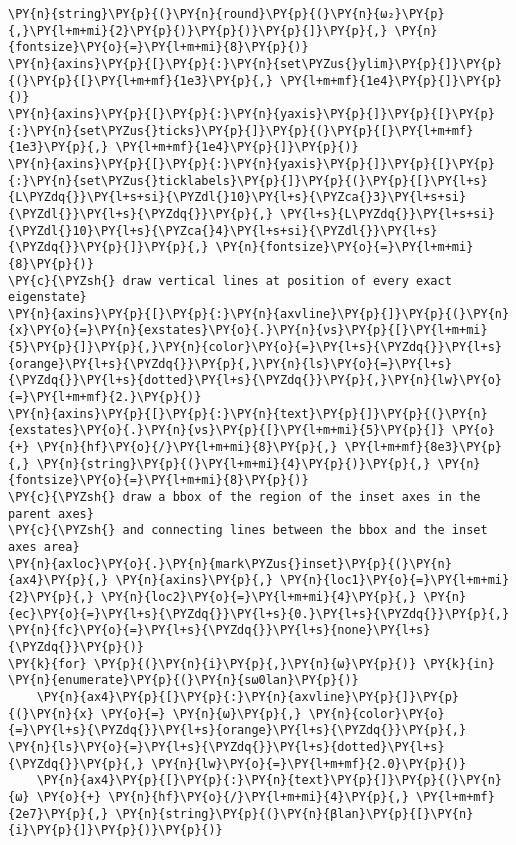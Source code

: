 \begin{Verbatim}[commandchars=\\\{\}]
   \PY{n}{string}\PY{p}{(}\PY{n}{round}\PY{p}{(}\PY{n}{ω₂}\PY{p}{,}\PY{l+m+mi}{2}\PY{p}{)}\PY{p}{)}\PY{p}{]}\PY{p}{,} \PY{n}{fontsize}\PY{o}{=}\PY{l+m+mi}{8}\PY{p}{)}
\PY{n}{axins}\PY{p}{[}\PY{p}{:}\PY{n}{set\PYZus{}ylim}\PY{p}{]}\PY{p}{(}\PY{p}{[}\PY{l+m+mf}{1e3}\PY{p}{,} \PY{l+m+mf}{1e4}\PY{p}{]}\PY{p}{)}
\PY{n}{axins}\PY{p}{[}\PY{p}{:}\PY{n}{yaxis}\PY{p}{]}\PY{p}{[}\PY{p}{:}\PY{n}{set\PYZus{}ticks}\PY{p}{]}\PY{p}{(}\PY{p}{[}\PY{l+m+mf}{1e3}\PY{p}{,} \PY{l+m+mf}{1e4}\PY{p}{]}\PY{p}{)}
\PY{n}{axins}\PY{p}{[}\PY{p}{:}\PY{n}{yaxis}\PY{p}{]}\PY{p}{[}\PY{p}{:}\PY{n}{set\PYZus{}ticklabels}\PY{p}{]}\PY{p}{(}\PY{p}{[}\PY{l+s}{L\PYZdq{}}\PY{l+s+si}{\PYZdl{}10}\PY{l+s}{\PYZca{}3}\PY{l+s+si}{\PYZdl{}}\PY{l+s}{\PYZdq{}}\PY{p}{,} \PY{l+s}{L\PYZdq{}}\PY{l+s+si}{\PYZdl{}10}\PY{l+s}{\PYZca{}4}\PY{l+s+si}{\PYZdl{}}\PY{l+s}{\PYZdq{}}\PY{p}{]}\PY{p}{,} \PY{n}{fontsize}\PY{o}{=}\PY{l+m+mi}{8}\PY{p}{)}
\PY{c}{\PYZsh{} draw vertical lines at position of every exact eigenstate}
\PY{n}{axins}\PY{p}{[}\PY{p}{:}\PY{n}{axvline}\PY{p}{]}\PY{p}{(}\PY{n}{x}\PY{o}{=}\PY{n}{exstates}\PY{o}{.}\PY{n}{νs}\PY{p}{[}\PY{l+m+mi}{5}\PY{p}{]}\PY{p}{,}\PY{n}{color}\PY{o}{=}\PY{l+s}{\PYZdq{}}\PY{l+s}{orange}\PY{l+s}{\PYZdq{}}\PY{p}{,}\PY{n}{ls}\PY{o}{=}\PY{l+s}{\PYZdq{}}\PY{l+s}{dotted}\PY{l+s}{\PYZdq{}}\PY{p}{,}\PY{n}{lw}\PY{o}{=}\PY{l+m+mf}{2.}\PY{p}{)}
\PY{n}{axins}\PY{p}{[}\PY{p}{:}\PY{n}{text}\PY{p}{]}\PY{p}{(}\PY{n}{exstates}\PY{o}{.}\PY{n}{νs}\PY{p}{[}\PY{l+m+mi}{5}\PY{p}{]} \PY{o}{+} \PY{n}{hf}\PY{o}{/}\PY{l+m+mi}{8}\PY{p}{,} \PY{l+m+mf}{8e3}\PY{p}{,} \PY{n}{string}\PY{p}{(}\PY{l+m+mi}{4}\PY{p}{)}\PY{p}{,} \PY{n}{fontsize}\PY{o}{=}\PY{l+m+mi}{8}\PY{p}{)}
\PY{c}{\PYZsh{} draw a bbox of the region of the inset axes in the parent axes}
\PY{c}{\PYZsh{} and connecting lines between the bbox and the inset axes area}
\PY{n}{axloc}\PY{o}{.}\PY{n}{mark\PYZus{}inset}\PY{p}{(}\PY{n}{ax4}\PY{p}{,} \PY{n}{axins}\PY{p}{,} \PY{n}{loc1}\PY{o}{=}\PY{l+m+mi}{2}\PY{p}{,} \PY{n}{loc2}\PY{o}{=}\PY{l+m+mi}{4}\PY{p}{,} \PY{n}{ec}\PY{o}{=}\PY{l+s}{\PYZdq{}}\PY{l+s}{0.}\PY{l+s}{\PYZdq{}}\PY{p}{,} \PY{n}{fc}\PY{o}{=}\PY{l+s}{\PYZdq{}}\PY{l+s}{none}\PY{l+s}{\PYZdq{}}\PY{p}{)}
\PY{k}{for} \PY{p}{(}\PY{n}{i}\PY{p}{,}\PY{n}{ω}\PY{p}{)} \PY{k}{in} \PY{n}{enumerate}\PY{p}{(}\PY{n}{sω0lan}\PY{p}{)}
    \PY{n}{ax4}\PY{p}{[}\PY{p}{:}\PY{n}{axvline}\PY{p}{]}\PY{p}{(}\PY{n}{x} \PY{o}{=} \PY{n}{ω}\PY{p}{,} \PY{n}{color}\PY{o}{=}\PY{l+s}{\PYZdq{}}\PY{l+s}{orange}\PY{l+s}{\PYZdq{}}\PY{p}{,} \PY{n}{ls}\PY{o}{=}\PY{l+s}{\PYZdq{}}\PY{l+s}{dotted}\PY{l+s}{\PYZdq{}}\PY{p}{,} \PY{n}{lw}\PY{o}{=}\PY{l+m+mf}{2.0}\PY{p}{)}
    \PY{n}{ax4}\PY{p}{[}\PY{p}{:}\PY{n}{text}\PY{p}{]}\PY{p}{(}\PY{n}{ω} \PY{o}{+} \PY{n}{hf}\PY{o}{/}\PY{l+m+mi}{4}\PY{p}{,} \PY{l+m+mf}{2e7}\PY{p}{,} \PY{n}{string}\PY{p}{(}\PY{n}{βlan}\PY{p}{[}\PY{n}{i}\PY{p}{]}\PY{p}{)}\PY{p}{)}

\end{Verbatim}
